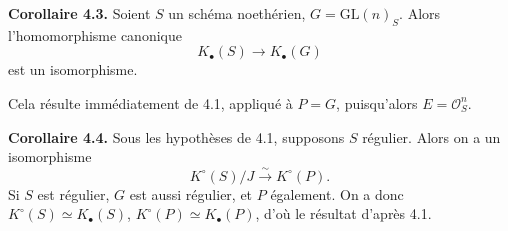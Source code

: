 \documentclass[11pt]{article}
\begin{document}
\textbf{Corollaire 4.3.} Soient $S$ un schéma noethérien, $G=\mathrm{GL}(n)_S$. Alors l'homomorphisme canonique
\[
K_\bullet(S)\longrightarrow K_\bullet(G)
\]
est un isomorphisme.

Cela résulte immédiatement de 4.1, appliqué à $P=G$, puisqu'alors $E=\mathcal O_S^n$.

\textbf{Corollaire 4.4.} Sous les hypothèses de 4.1, supposons $S$ régulier. Alors on a un isomorphisme
\[
K^\circ(S)/J\xrightarrow{\sim}K^\circ(P).
\]
Si $S$ est régulier, $G$ est aussi régulier, et $P$ également. On a donc $K^\circ(S)\simeq K_\bullet(S)$, $K^\circ(P)\simeq K_\bullet(P)$, d'où le résultat d'après 4.1.
\end{document}
